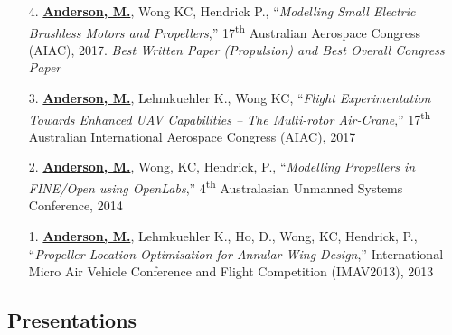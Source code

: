 \documentclass[12pt,letter,sans]{moderncv}        %
\begin{document}
\begin{itemize}
    \item [4.] \underline{\textbf{Anderson, M.}}, Wong KC, Hendrick P., ``\textit{Modelling Small Electric Brushless Motors and Propellers},'' 17\textsuperscript{th} Australian Aerospace Congress (AIAC), 2017. \textit{Best Written Paper (Propulsion) and Best Overall Congress Paper}
    
    \item [3.] \underline{\textbf{Anderson, M.}}, Lehmkuehler K., Wong KC, ``\textit{Flight Experimentation Towards Enhanced UAV Capabilities -- The Multi-rotor Air-Crane},'' 17\textsuperscript{th} Australian International Aerospace Congress (AIAC), 2017
    
    \item [2.] \underline{\textbf{Anderson, M.}}, Wong, KC, Hendrick, P., ``\textit{Modelling Propellers in FINE/Open using OpenLabs},'' 4\textsuperscript{th} Australasian Unmanned Systems Conference, 2014
    
    \item [1.] \underline{\textbf{Anderson, M.}}, Lehmkuehler K., Ho, D., Wong, KC, Hendrick, P., ``\textit{Propeller Location Optimisation for Annular Wing Design},'' International Micro Air Vehicle Conference and Flight Competition (IMAV2013), 2013
    
\end{itemize}



    
    

\newpage

\subsection{Presentations}
\end{document}
